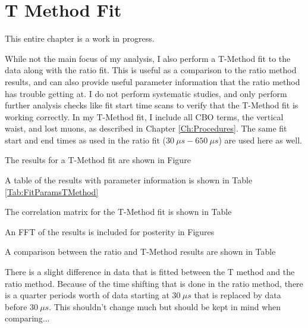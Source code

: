 \graphicspath{ {Figures/TMethod/ResidualsFFT/} {Figures/TMethod/Comparison/} {Figures/TMethod/RandomSeeds/} }

\chapter{T Method Fit}
\label{Ch:TMethod}

This entire chapter is a work in progress.


While not the main focus of my analysis, I also perform a T-Method fit to the data along with the ratio fit. This is useful as a comparison to the ratio method results, and can also provide useful parameter information that the ratio method has trouble getting at. I do not perform systematic studies, and only perform further analysis checks like fit start time scans to verify that the T-Method fit is working correctly. In my T-Method fit, I include all CBO terms, the vertical waist, and lost muons, as described in Chapter \ref{Ch:Procedures}. The same fit start and end times as used in the ratio fit ($\SI{30}{\mu s} - \SI{650}{\mu s}$) are used here as well.

The results for a T-Method fit are shown in Figure 

A table of the results with parameter information is shown in Table \ref{Tab:FitParamsTMethod}

The correlation matrix for the T-Method fit is shown in Table

An FFT of the results is included for posterity in Figures 



A comparison between the ratio and T-Method results are shown in Table

There is a slight difference in data that is fitted between the T method and the ratio method. Because of the time shifting that is done in the ratio method, there is a quarter \gmtwo periods worth of data starting at $\SI{30}{\mu s}$ that is replaced by data before $\SI{30}{\mu s}$. This shouldn't change much but should be kept in mind when comparing...



